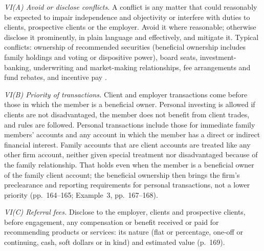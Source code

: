 \begin{qfrule}\label{rule:standard-conflicts-of-interest}
 \emph{VI(A) Avoid or disclose conflicts.} A conflict is any matter that could reasonably be expected to impair independence and objectivity or interfere with duties to clients, prospective clients or the employer. Avoid it where reasonable; otherwise disclose it prominently, in plain language and effectively, and mitigate it. Typical conflicts: ownership of recommended securities (beneficial ownership includes family holdings and voting or dispositive power), board seats, investment-banking, underwriting and market-making relationships, fee arrangements and fund rebates, and incentive pay \citep[pp.~157--160]{standards-practice-handbook-2024}.

\emph{VI(B) Priority of transactions.} Client and employer transactions come before those in which the member is a beneficial owner. Personal investing is allowed if clients are not disadvantaged, the member does not benefit from client trades, and rules are followed. Personal transactions include those for immediate family members' accounts and any account in which the member has a direct or indirect financial interest. Family accounts that are client accounts are treated like any other firm account, neither given special treatment nor disadvantaged because of the family relationship. That holds even when the member is a beneficial owner of the family client account; the beneficial ownership then brings the firm's preclearance and reporting requirements for personal transactions, not a lower priority (pp.~164--165; Example~3, pp.~167--168).

\emph{VI(C) Referral fees.} Disclose to the employer, clients and prospective clients, before engagement, any compensation or benefit received or paid for recommending products or services: its nature (flat or percentage, one-off or continuing, cash, soft dollars or in kind) and estimated value (p.~169).


\end{qfrule}
